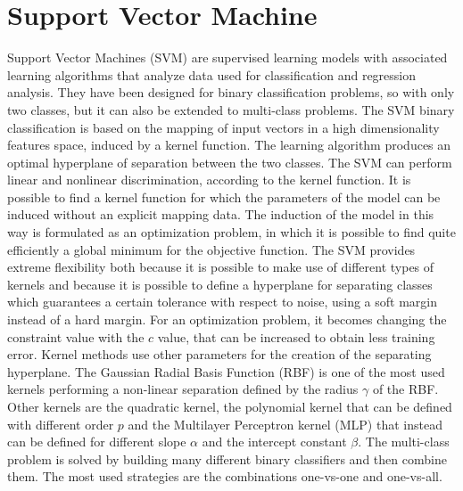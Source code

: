 \section{Support Vector Machine} \label{SVM}
Support Vector Machines (\acs{SVM}) are supervised learning models with associated learning algorithms that analyze data used for classification and regression analysis. They have been designed for binary classification problems, so with only two classes, but it can also be extended to multi-class problems. The SVM binary classification is based on the mapping of input vectors in a high dimensionality features space, induced by a kernel function. The learning algorithm produces an optimal hyperplane of separation between the two classes. The SVM can perform linear and nonlinear discrimination, according to the kernel function. It is possible to find a kernel function for which the parameters of the model can be induced without an explicit mapping data. The induction of the model in this way is formulated as an optimization problem, in which it is possible to find quite efficiently a global minimum for the objective function. The SVM provides extreme flexibility both because it is possible to make use of different types of kernels and because it is possible to define a hyperplane for separating classes which guarantees a certain tolerance with respect to noise, using a soft margin instead of a hard margin. For an optimization problem, it becomes changing the constraint value with the $c$ value, that can be increased to obtain less training error. Kernel methods use other parameters for the creation of the separating hyperplane. The Gaussian Radial Basis Function (\acs{RBF}) is one of the most used kernels performing a non-linear separation defined by the radius  $\gamma$ of the RBF. Other kernels are the quadratic kernel, the polynomial kernel that can be defined with different order $p$ and the Multilayer Perceptron kernel (MLP) that instead can be defined for different slope $\alpha$ and the intercept constant $\beta$. The multi-class problem is solved by building many different binary classifiers and then combine them. The most used strategies are the combinations one-vs-one and one-vs-all. 

